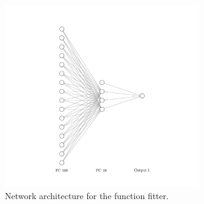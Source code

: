 \documentclass[12pt,a4paper]{article}
\begin{document}
\begin{figure}[htb]
	\centering
	\includegraphics[width=0.75\textwidth]{func-fit.png}
	\caption{Network architecture for the function fitter.}
	\label{fig:funcfit-architecture}
\end{figure}
\end{document}
